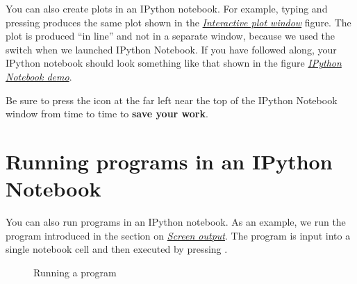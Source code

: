 \documentclass[letterpaper,10pt,english]{sphinxmanual}
\begin{document}
You can also create plots in an IPython notebook.  For example, typing  and pressing  produces  the same plot shown in the {\hyperref[chap5/chap5_plot:fig-zigzagplotdemo]{\emph{Interactive plot window}}} figure.  The plot is produced ``in line'' and not in a separate window, because we used the  switch when we launched IPython Notebook.  If you have followed along, your IPython notebook should look something like that shown in the figure {\hyperref[apdx2/apdx2_ipynb:fig-firstipynbcells]{\emph{IPython Notebook demo}}}.

Be sure to press the  icon at the far left near the top of the IPython Notebook window from time to time to \textbf{save your work}.


\section{Running programs in an IPython Notebook}
\label{apdx2/apdx2_ipynb:running-programs-in-an-ipython-notebook}
You can also run programs in an IPython notebook.  As an example, we run the program introduced in the section on {\hyperref[chap4/chap4_io:screenoutput]{\emph{Screen output}}}.  The program is input into a single notebook cell and then executed by pressing .
\begin{figure}[htbp]
\centering
\capstart

\caption{Running a program}\label{apdx2/apdx2_ipynb:fig-mileagenb}\end{figure}
\end{document}
